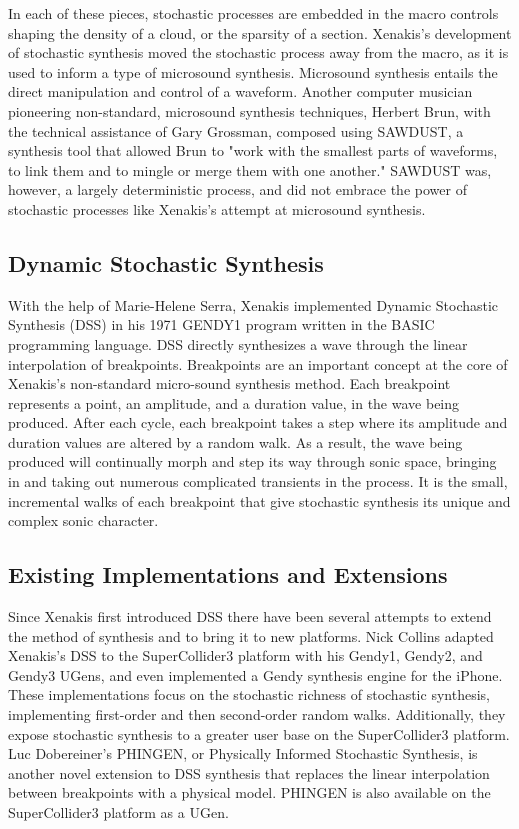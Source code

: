 \documentclass[10pt]{article}
\begin{document}
In each of these pieces, stochastic processes are embedded in the macro controls shaping the density of a cloud, or the sparsity of a section. Xenakis's development of stochastic synthesis moved the stochastic process away from the macro, as it is used to inform a type of microsound synthesis. Microsound synthesis entails the direct manipulation and control of a waveform. Another computer musician pioneering non-standard, microsound synthesis techniques, Herbert Brun, with the technical assistance of Gary Grossman, composed using SAWDUST, a synthesis tool that allowed Brun to "work with the smallest parts of waveforms, to link them and to mingle or merge them with one another."\citep{sergio2006} SAWDUST was, however, a largely deterministic process, and did not embrace the power of stochastic processes like Xenakis's attempt at microsound synthesis.

\subsection{Dynamic Stochastic Synthesis}
 With the help of Marie-Helene Serra, Xenakis implemented Dynamic Stochastic Synthesis (DSS) in his 1971 GENDY1 program written in the BASIC programming language.\citep{xenakis1992} DSS directly synthesizes a wave through the linear interpolation of breakpoints. Breakpoints are an important concept at the core of Xenakis's non-standard micro-sound synthesis method. Each breakpoint represents a point, an amplitude, and a duration value, in the wave being produced. After each cycle, each breakpoint takes a step where its amplitude and duration values are altered by a random walk. As a result, the wave being produced will continually morph and step its way through sonic space, bringing in and taking out numerous complicated transients in the process. It is the small, incremental walks of each breakpoint that give stochastic synthesis its unique and complex sonic character.

\subsection{Existing Implementations and Extensions}
Since Xenakis first introduced DSS there have been several attempts to extend the method of synthesis and to bring it to new platforms. Nick Collins adapted Xenakis's DSS to the SuperCollider3 platform with his Gendy1, Gendy2, and Gendy3 UGens, and even implemented a Gendy synthesis engine for the iPhone.\citep{collins2011} These implementations focus on the stochastic richness of stochastic synthesis, implementing first-order and then second-order random walks. Additionally, they expose stochastic synthesis to a greater user base on the SuperCollider3 platform. Luc Dobereiner's PHINGEN, or Physically Informed Stochastic Synthesis, is another novel extension to DSS synthesis that replaces the linear interpolation between breakpoints with a physical model.\citep{luc2011dobereiner} PHINGEN is also available on the SuperCollider3 platform as a UGen.
\end{document}

